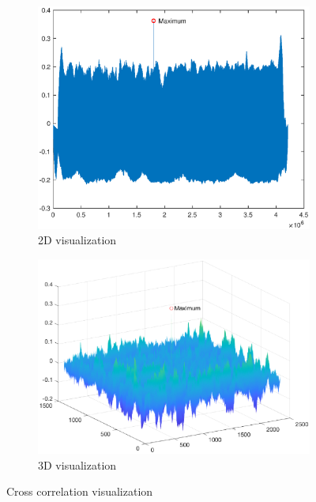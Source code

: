 \begin{figure}[h!]
	\centering
	\begin{subfigure}[t]{0.45\linewidth}
		\includegraphics[width=1\linewidth]{figures/part1/crr_vis1.eps}
		\caption{2D visualization}
		\label{fig:crr_vis1}
	\end{subfigure}
	\begin{subfigure}[t]{0.45\linewidth}
		\centering
		\includegraphics[width=1\linewidth]{figures/part1/crr_vis2.eps}
		\caption{3D visualization}
		\label{fig:crr_vis2}
	\end{subfigure}
	\caption{Cross correlation visualization}
\end{figure} 

